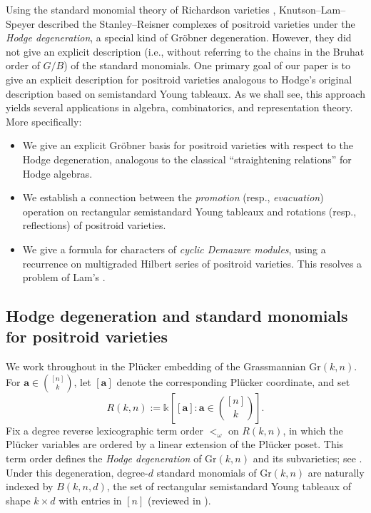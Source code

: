 \documentclass[12pt,reqno]{amsart}
\theoremstyle{definition}
\renewcommand{\aa}{\mathbf a}
\renewcommand{\k}{\mathbb{k}}
\newcommand{\gr}{\mathrm{Gr}}
\begin{document}
Using the standard monomial theory of Richardson varieties \cites{ lakshmibai2003richardson,BrionLak},
Knutson--Lam--Speyer \cite{KLS2014projections} described the Stanley--Reisner complexes of positroid varieties 
under the \emph{Hodge degeneration}, a special kind of Gr\"obner degeneration.
However, they did not give an explicit description (i.e., without referring to the chains in the Bruhat order of $G/B$) of the standard monomials. One primary goal of our paper is to give an explicit description for positroid varieties analogous to Hodge's original description based on semistandard Young tableaux. As we shall see, this approach yields several applications in algebra, combinatorics, and representation theory. More specifically:
\begin{itemize}
    \item We give an explicit Gr\"obner basis for positroid varieties with respect to the Hodge degeneration, analogous to the classical ``straightening relations'' for Hodge algebras. 
    \item We establish a connection between the \emph{promotion} (resp., \emph{evacuation}) operation on rectangular semistandard Young tableaux and  rotations  (resp., reflections) of positroid varieties.
    \item We give a formula for characters of \emph{cyclic Demazure modules}, using a recurrence on multigraded Hilbert series of positroid varieties. This resolves a problem of Lam's \cite{Lam19}.
\end{itemize}

\subsection{Hodge degeneration and standard monomials for positroid varieties}
We work throughout in the Pl\"ucker embedding of the Grassmannian $\gr(k,n)$.
For $\aa\in\binom{[n]}{k}$, let $[\aa]$ denote the corresponding Pl\"ucker coordinate, and set
\[
R(k,n):=\k[[\aa]:\aa\in\binom{[n]}{k}].
\]
Fix a degree reverse lexicographic term order $<_\omega$ on $R(k,n)$, in which the Pl\"ucker variables are ordered by a linear extension of the Pl\"ucker poset.
This term order defines the \emph{Hodge degeneration} of $\gr(k,n)$ and its subvarieties; see .
Under this degeneration, degree-$d$ standard monomials of $\gr(k,n)$ are naturally indexed by
$B(k,n,d)$, the set of rectangular semistandard Young tableaux of shape $k\times d$ with entries in $[n]$
(reviewed in ).
\end{document}

